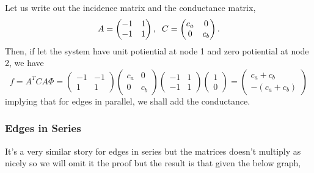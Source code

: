 \documentclass[]{article}
\begin{document}
Let us write out the incidence matrix and the conductance matrix, \[
A =
\begin{pmatrix}
-1 & 1 \\ -1 & 1
\end{pmatrix},
\hspace{2mm}
C = 
\begin{pmatrix}
c_a & 0 \\ 0 & c_b
\end{pmatrix}.
\] Then, if let the system have unit potiential at node 1 and zero
potiential at node 2, we have \[
f = A^T C A \Phi = 
\begin{pmatrix}
-1 & -1 \\ 1 & 1
\end{pmatrix}
\begin{pmatrix}
c_a & 0 \\ 0 & c_b
\end{pmatrix}
\begin{pmatrix}
-1 & 1 \\ -1 & 1
\end{pmatrix}
\begin{pmatrix}
1 \\ 0
\end{pmatrix}
=
\begin{pmatrix}
c_a + c_b \\ -(c_a + c_b)
\end{pmatrix}
\] implying that for edges in parallel, we shall add the conductance.

\subsubsection{Edges in Series}\label{edges-in-series}

It's a very similar story for edges in series but the matrices doesn't
multiply as nicely so we will omit it the proof but the result is that
given the below graph,
\end{document}

